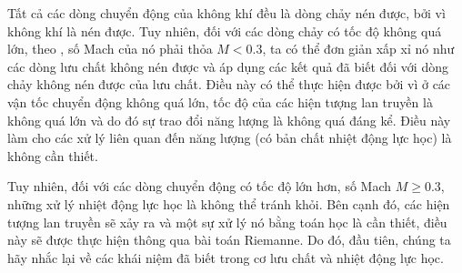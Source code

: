 \documentclass[../../../main.tex]{subfiles}
\begin{document}
    Tất cả các dòng chuyển động của không khí đều là dòng chảy nén được, bởi vì không khí là nén được. Tuy nhiên, đối với các dòng chảy có tốc độ không quá lớn, theo , số Mach của nó phải thỏa $M <0.3$, ta có thể đơn giản xấp xỉ nó như các dòng lưu chất không nén được và áp dụng các kết quả đã biết đối với dòng chảy không nén được của lưu chất. Điều này có thể thực hiện được bởi vì ở các vận tốc chuyển động không quá lớn, tốc độ của các hiện tượng lan truyền là không quá lớn và do đó sự trao đổi năng lượng là không quá đáng kể. Điều này làm cho các xử lý liên quan đến năng lượng (có bản chất nhiệt động lực học) là không cần thiết.

    Tuy nhiên, đối với các dòng chuyển động có tốc độ lớn hơn, số Mach $M\ge 0.3$, những xử lý nhiệt động lực học là không thể tránh khỏi. Bên cạnh đó, các hiện tượng lan truyền sẽ xảy ra và một sự xử lý nó bằng toán học là cần thiết, điều này sẽ được thực hiện thông qua bài toán Riemanne. Do đó, đầu tiên, chúng ta hãy nhắc lại về các khái niệm đã biết trong cơ lưu chất và nhiệt động lực học.
\end{document}
